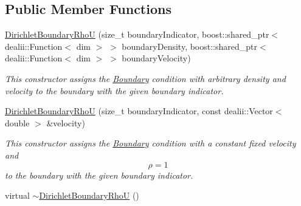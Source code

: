 \subsection*{Public Member Functions}
\begin{DoxyCompactItemize}
\item 
\hyperlink{classnatrium_1_1DirichletBoundaryRhoU_a72588bbed7cb004e02aaa562083a5527}{DirichletBoundaryRhoU} (size\_\-t boundaryIndicator, boost::shared\_\-ptr$<$ dealii::Function$<$ dim $>$ $>$ boundaryDensity, boost::shared\_\-ptr$<$ dealii::Function$<$ dim $>$ $>$ boundaryVelocity)
\begin{DoxyCompactList}\small\item\em This constructor assigns the \hyperlink{classnatrium_1_1Boundary}{Boundary} condition with arbitrary density and velocity to the boundary with the given boundary indicator. \item\end{DoxyCompactList}\item 
\hyperlink{classnatrium_1_1DirichletBoundaryRhoU_aefca829931a4c3e9c3f65e5889533c45}{DirichletBoundaryRhoU} (size\_\-t boundaryIndicator, const dealii::Vector$<$ double $>$ \&velocity)
\begin{DoxyCompactList}\small\item\em This constructor assigns the \hyperlink{classnatrium_1_1Boundary}{Boundary} condition with a constant fixed velocity and \[ \rho = 1 \] to the boundary with the given boundary indicator. \item\end{DoxyCompactList}\item 
\hypertarget{classnatrium_1_1DirichletBoundaryRhoU_a223e9b3e61033bcb30a3ad2a9d8994ea}{
virtual \hyperlink{classnatrium_1_1DirichletBoundaryRhoU_a223e9b3e61033bcb30a3ad2a9d8994ea}{$\sim$DirichletBoundaryRhoU} ()}
\label{classnatrium_1_1DirichletBoundaryRhoU_a223e9b3e61033bcb30a3ad2a9d8994ea}


\end{DoxyCompactItemize}
